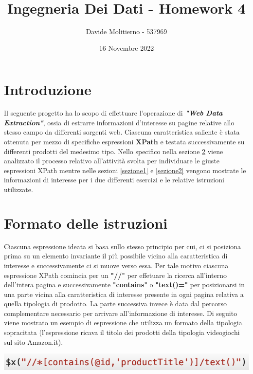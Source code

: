 \documentclass[12pt, letterpaper]{article}
\title{Ingegneria Dei Dati - Homework 4}
\author{Davide Molitierno - 537969}
\date{16 Novembre 2022}
\begin{document}
\maketitle

\section{Introduzione}
Il seguente progetto ha lo scopo di effettuare l'operazione di \emph{\textbf{"Web Data Extraction"}}, ossia di estrarre informazioni d'interesse su pagine relative allo stesso campo da differenti sorgenti web. Ciascuna caratteristica saliente è stata ottenuta per mezzo di specifiche espressioni \textbf{XPath} e testata successivamente su differenti prodotti del medesimo tipo.
Nello specifico nella sezione \ref{istruzioni} viene analizzato il processo relativo all'attività svolta per individuare le giuste espressioni XPath mentre nelle sezioni \ref{sezione1} e \ref{sezione2} vengono mostrate le informazioni di interesse per i due differenti esercizi e le relative istruzioni utilizzate.
\section{Formato delle istruzioni} \label{istruzioni}
Ciascuna espressione ideata si basa sullo stesso principio per cui, ci si posiziona prima su un elemento invariante il più possibile vicino alla caratteristica di interesse e successivamente ci si muove verso essa. Per tale motivo ciascuna espressione XPath comincia per un \textbf{"//"} per effetuare la ricerca all'interno dell'intera pagina e successivamente \textbf{"contains"} o \textbf{"text()="} per posizionarsi in una parte vicina alla caratteristica di interesse presente in ogni pagina relativa a quella tipologia di prodotto. La parte successiva invece è data dal percorso complementare necessario per arrivare all'informazione di interesse. Di seguito viene mostrato un esempio di espressione che utilizza un formato della tipologia sopracitata (l'espressione ricava il titolo dei prodotti della tipologia videogiochi sul sito Amazon.it).

\begin{center}
    \includegraphics{Espressione XPath}
\end{center}
\end{document}
